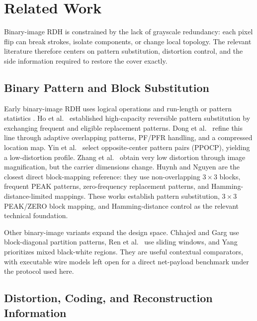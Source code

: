 \documentclass[a4paper,fleqn]{cas-dc}
\newcommand{\RevisionAddBegin}{\begingroup}
\newcommand{\RevisionAddEnd}{\endgroup}
\newcommand{\RevisionAddBegin}{\begingroup\color{revisionblue}}
\newcommand{\RevisionAddEnd}{\endgroup}
\begin{document}
\section{Related Work}
\label{sec:relatedwork}

\RevisionAddBegin
Binary-image RDH is constrained by the lack of grayscale redundancy: each
pixel flip can break strokes, isolate components, or change local topology.
The relevant literature therefore centers on pattern substitution, distortion
control, and the side information required to restore the cover exactly.
\RevisionAddEnd

\RevisionAddBegin
\subsection{Binary Pattern and Block Substitution}
\RevisionAddEnd

\RevisionAddBegin
Early binary-image RDH uses logical operations and run-length or pattern
statistics \cite{Xuan2008RunLength}. Ho et al.\ \cite{Ho2009PatternSubstitution} established
high-capacity reversible pattern substitution by exchanging frequent and
eligible replacement patterns. Dong et al.\ \cite{Dong2020Adaptive} refine this
line through adaptive overlapping patterns, PF/PFR handling, and a compressed
location map. Yin et al.\ \cite{Yin2020PPOCP} select opposite-center pattern
pairs (PPOCP), yielding a low-distortion profile. Zhang et al.\
\cite{Zhang2019Magnification} obtain very low distortion through image
magnification, but the carrier dimensions change. Huynh and Nguyen
\cite{Huynh2025BlockMapping} are the closest direct block-mapping reference:
they use non-overlapping $3\times3$ blocks, frequent PEAK patterns,
zero-frequency replacement patterns, and Hamming-distance-limited mappings.
These works establish pattern substitution, $3\times3$ PEAK/ZERO block
mapping, and Hamming-distance control as the relevant technical foundation.
\RevisionAddEnd

\RevisionAddBegin
Other binary-image variants expand the design space. Chhajed and Garg
\cite{Chhajed2023BlockDiagonal} use block-diagonal partition patterns, Ren
et al.\ \cite{Ren2023Sliding} use sliding windows, and Yang
\cite{Yang2023Large} prioritizes mixed black-white regions. They are useful
contextual comparators, with executable wire models left open for a direct
net-payload benchmark under the protocol used here.
\RevisionAddEnd

\RevisionAddBegin
\subsection{Distortion, Coding, and Reconstruction Information}
\RevisionAddEnd
\end{document}
